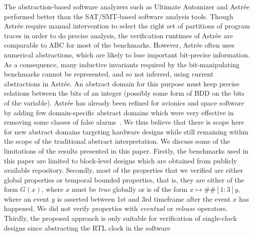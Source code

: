 %
The abstraction-based software analyzers such as Ultimate Automizer and Astr{\'e}e 
performed better than the SAT/SMT-based software analysis tools.  Though 
Astr{\'e}e require manual intervention to select the right set of partitions 
of program traces in order to do precise analysis, the verification runtimes 
of Astr{\'e}e are comparable to ABC for most of the benchmarks.  However, 
Astr{\'e}e often uses numerical abstractions, which are likely to lose 
important bit-precise information.  
%
As a consequence, many inductive invariants required by the bit-manipulating 
benchmarks cannot be represented, and so not inferred, using current abstractions 
in Astr{\'e}e.  An abstract domain for this purpose must keep 
precise relations between the bits of an integer (possibly some 
form of BDD on the bits of the variable).  Astr{\'e}e has already been 
refined for avionics and space software by adding few domain-specific 
abstract domains which were very effective in removing some classes of 
false alarms~\cite{DBLP:journals/ftpl/BertraneCCFMMR15}.  We thus believe 
that there is scope here for new abstract domains targeting hardware 
designs while still remaining within the scope of the traditional abstract 
interpretation. 
%
% 
We discuss some of the limitations of the results presented in this paper.  
Firstly, the benchmarks used in this paper are limited to block-level 
designs which are obtained from publicly available repository. 
% 
Secondly, most of the properties that we verified are either global properties 
or temporal bounded properties, that is, they are either of the form 
$G(x)$, where $x$ must be \emph{true} globally or is of the form 
$x \mapsto \#\#[1:3] y$, where an event $y$ is asserted between 1st and 
3rd timeframe after the event $x$ has happened.  We did not verify 
properties with \emph{eventual} or \emph{release} operators. 
%  
Thirdly, the proposed approach is only suitable for verification of 
single-clock designs since abstracting the RTL clock in the software 

